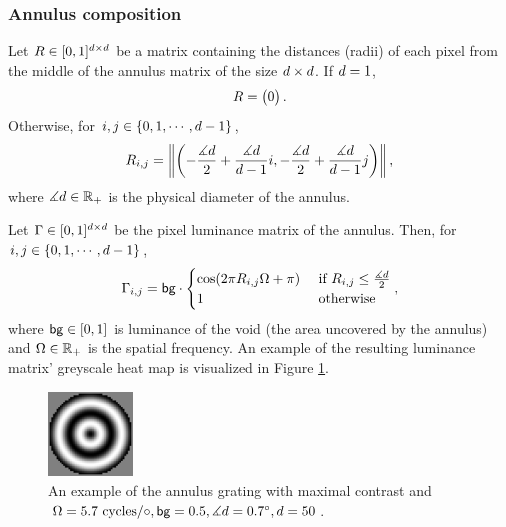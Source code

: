 \subsubsection{Annulus composition}
\label{sec:annulus-composition}

Let $R \in [0, 1]^{d \times d}$ be a matrix containing the distances (radii) of each pixel from the middle of the annulus matrix of the size $d \times d$. If $d = 1$,
\begin{equation}
    R = 
    \begin{pmatrix}
        0
    \end{pmatrix}.
\end{equation}
Otherwise, for $i, j \in \{ 0, 1, \cdots,  d-1 \}$,
\begin{equation}
    R_{i, j} = \left\| 
        \left(
            -\frac{\measuredangle d}{2} + \frac{\measuredangle d}{d - 1} i, 
            -\frac{\measuredangle d}{2} + \frac{\measuredangle d}{d - 1} j 
        \right) 
    \right\|,
\end{equation}
where $\measuredangle d \in \mathbb{R}_+$ is the physical diameter of the annulus.

Let $\Gamma \in [0, 1]^{d \times d}$ be the pixel luminance matrix of the annulus. Then, for $i, j \in \{ 0, 1, \cdots,  d-1 \}$,
\begin{equation}
    \Gamma_{i, j} = \mathsf{bg} \cdot
    \begin{cases}
        \cos(2 \pi R_{i, j} \Omega + \pi) 
        &\text{ if } R_{i, j} \leq \frac{\measuredangle d}{2} \\
        1 
        &\text{ otherwise}
    \end{cases},
    \label{eq:grating}
\end{equation}
where $\mathsf{bg} \in [0, 1]$ is luminance of the void (the area uncovered by the annulus) and $\Omega \in \mathbb{R}_+$ is the spatial frequency.
An example of the resulting luminance matrix' greyscale heat map is visualized in Figure \ref{fig:grating-example}.

\begin{figure}[!htp]
    \centering
    \includegraphics[width=0.2\textwidth]{assets/images/grating.png}
    \caption[Grating annulus]{An example of the annulus grating with maximal contrast and $\Omega = 5.7 \text{ cycles}/\circ, \mathsf{bg} = 0.5, \measuredangle d = 0.7^\circ, d = 50$.}
    \label{fig:grating-example}
\end{figure}